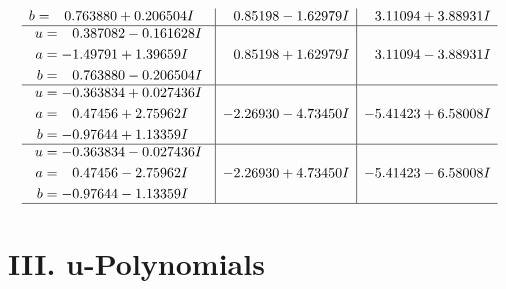 \documentclass[1p]{elsarticle_modified}
\theoremstyle{definition}
\begin{document}
$$\begin{array}{c|c|c}
\begin{aligned}
b &= \phantom{-}0.763880 + 0.206504 I\end{aligned}
 & \phantom{-}0.85198 - 1.62979 I & \phantom{-}3.11094 + 3.88931 I \\ \hline\begin{aligned}
u &= \phantom{-}0.387082 - 0.161628 I \\
a &= -1.49791 + 1.39659 I \\
b &= \phantom{-}0.763880 - 0.206504 I\end{aligned}
 & \phantom{-}0.85198 + 1.62979 I & \phantom{-}3.11094 - 3.88931 I \\ \hline\begin{aligned}
u &= -0.363834 + 0.027436 I \\
a &= \phantom{-}0.47456 + 2.75962 I \\
b &= -0.97644 + 1.13359 I\end{aligned}
 & -2.26930 - 4.73450 I & -5.41423 + 6.58008 I \\ \hline\begin{aligned}
u &= -0.363834 - 0.027436 I \\
a &= \phantom{-}0.47456 - 2.75962 I \\
b &= -0.97644 - 1.13359 I\end{aligned}
 & -2.26930 + 4.73450 I & -5.41423 - 6.58008 I\\
 \hline 
 \end{array}$$\newpage
\newpage\renewcommand{\arraystretch}{1}
\centering \section*{ III. u-Polynomials}
\end{document}
